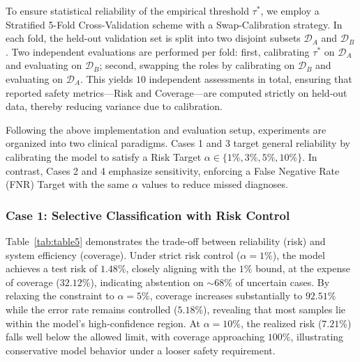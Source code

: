 \documentclass[sigconf,review,anonymous]{acmart}
\theoremstyle{remark}
\begin{document}
To ensure statistical reliability of the empirical threshold $\tau^*$, we employ a Stratified 5-Fold Cross-Validation scheme with a Swap-Calibration strategy. In each fold, the held-out validation set is split into two disjoint subsets $\mathcal{D}_A$ and $\mathcal{D}_B$. Two independent evaluations are performed per fold: first, calibrating $\tau^*$ on $\mathcal{D}_A$ and evaluating on $\mathcal{D}_B$; second, swapping the roles by calibrating on $\mathcal{D}_B$ and evaluating on $\mathcal{D}_A$. This yields $10$ independent assessments in total, ensuring that reported safety metrics—Risk and Coverage—are computed strictly on held-out data, thereby reducing variance due to calibration.

Following the above implementation and evaluation setup, experiments are organized into two clinical paradigms. Cases 1 and 3 target general reliability by calibrating the model to satisfy a Risk Target $\alpha \in \{1\%, 3\%, 5\%, 10\%\}$. In contrast, Cases 2 and 4 emphasize sensitivity, enforcing a False Negative Rate (FNR) Target with the same $\alpha$ values to reduce missed diagnoses.

\subsubsection{\textbf{Case 1: Selective Classification with Risk Control}}
\label{sec:case1_results}

Table~\ref{tab:table5} demonstrates the trade-off between reliability (risk) and system efficiency (coverage). Under strict risk control ($\alpha=1\%$), the model achieves a test risk of $1.48\%$, closely aligning with the $1\%$ bound, at the expense of coverage ($32.12\%$), indicating abstention on ${\sim}68\%$ of uncertain cases. By relaxing the constraint to $\alpha=5\%$, coverage increases substantially to $92.51\%$ while the error rate remains controlled ($5.18\%$), revealing that most samples lie within the model’s high-confidence region. At $\alpha=10\%$, the realized risk ($7.21\%$) falls well below the allowed limit, with coverage approaching $100\%$, illustrating conservative model behavior under a looser safety requirement.

\begin{table}[htbp]
    \caption{The selective classification performance of Case 1.}
    \label{tab:table5}
    \vskip -0.1in
\end{table}
\end{document}
